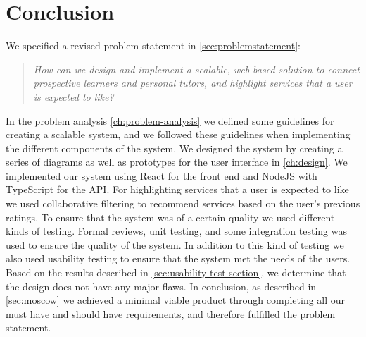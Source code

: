 \chapter{Conclusion}
We specified a revised problem statement in \autoref{sec:problemstatement}:
\begin{quote}
    \textit{How can we design and implement a scalable, web-based solution to connect prospective learners and personal tutors, and highlight services that a user is expected to like?}
\end{quote}
In the problem analysis \autoref{ch:problem-analysis} we defined some guidelines for creating a scalable system, and we followed these guidelines when implementing the different components of the system.
We designed the system by creating a series of diagrams as well as prototypes for the user interface in \autoref{ch:design}.
We implemented our system using React for the front end and NodeJS with TypeScript for the API.
For highlighting services that a user is expected to like we used collaborative filtering to recommend services based on the user's previous ratings.
To ensure that the system was of a certain quality we used different kinds of testing.
Formal reviews, unit testing, and some integration testing was used to ensure the quality of the system.
In addition to this kind of testing we also used usability testing to ensure that the system met the needs of the users.
Based on the results described in \autoref{sec:usability-test-section}, we determine that the design does not have any major flaws.
In conclusion, as described in \autoref{sec:moscow} we achieved a minimal viable product through completing all our must have and should have requirements, and therefore fulfilled the problem statement.